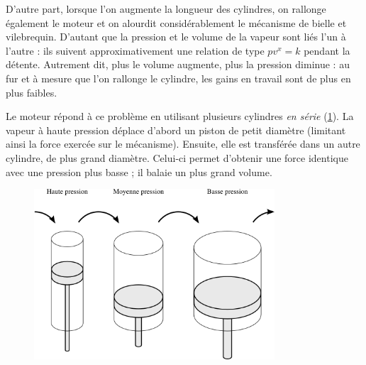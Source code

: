 	D’autre part, lorsque l’on augmente la longueur des cylindres, on rallonge également le moteur et on alourdit considérablement le mécanisme de bielle et vile\-brequin. D’autant que la pression et le volume de la vapeur sont liés l’un à l’autre : ils suivent approximativement une relation de type $p v^{x} = k$ pendant la détente. Autrement dit, plus le volume augmente, plus la pression diminue : au fur et à mesure que l’on rallonge le cylindre, les gains en travail sont de plus en plus faibles.

	Le moteur  répond à ce problème en utilisant plusieurs cylindres \textit{en série} (\cref{fig_cylindres_compound}). La vapeur à haute pression déplace d’abord un piston de petit diamètre (limitant ainsi la force exercée sur le mécanisme). Ensuite, elle est transférée dans un autre cylindre, de plus grand diamètre. Celui-ci permet d’obtenir une force identique avec une pression plus basse ; il balaie un plus grand volume.

	\begin{figure}
		\begin{center}
			\includegraphics[width=0.8\textwidth]{images/cylindres_compound.png}
			\onlyamphibook{\vspace{-1cm}}%
		\end{center}
		\label{fig_cylindres_compound}
			\onlyamphibook{\vspace{-1em}}%
	\end{figure}

